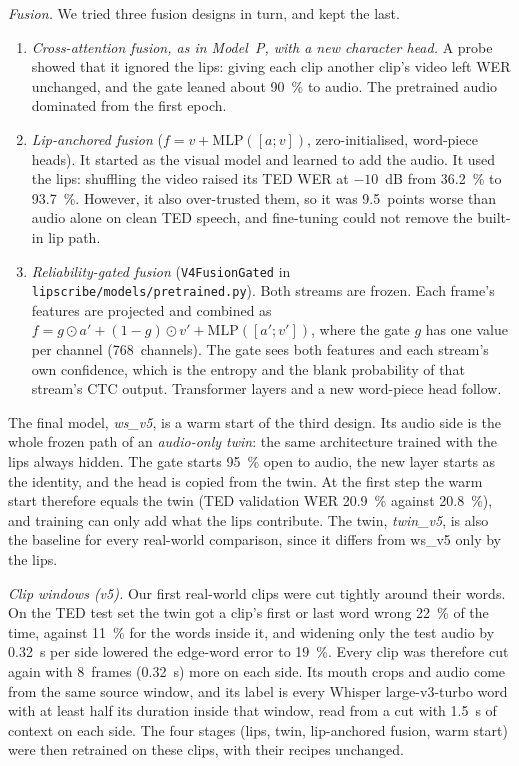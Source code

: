 \textit{Fusion.} We tried three fusion designs in turn, and kept the last.
\begin{enumerate}
\item \textit{Cross-attention fusion, as in Model~P, with a new character head.} A probe showed
that it ignored the lips: giving each clip another clip's video left WER unchanged, and the gate
leaned about 90~\% to audio. The pretrained audio dominated from the first epoch.
\item \textit{Lip-anchored fusion} ($f = v + \mathrm{MLP}([a; v])$, zero-initialised, word-piece
heads). It started as the visual model and learned to add the audio. It used the lips: shuffling
the video raised its TED WER at $-10$~dB from 36.2~\% to 93.7~\%. However, it also over-trusted
them, so it was 9.5~points worse than audio alone on clean TED speech, and fine-tuning could not
remove the built-in lip path.
\item \textit{Reliability-gated fusion} (\texttt{V4FusionGated} in
\texttt{lipscribe/models/pretrained.py}). Both streams are frozen. Each frame's features are
projected and combined as $f = g \odot a' + (1 - g) \odot v' + \mathrm{MLP}([a'; v'])$, where the
gate $g$ has one value per channel (768~channels). The gate sees both features and each stream's
own confidence, which is the entropy and the blank probability of that stream's CTC output.
Transformer layers and a new word-piece head follow.
\end{enumerate}
The final model, \textit{ws\_v5}, is a warm start of the third design. Its audio side is the whole
frozen path of an \textit{audio-only twin}: the same architecture trained with the lips always
hidden. The gate starts 95~\% open to audio, the new layer starts as the identity, and the head is
copied from the twin. At the first step the warm start therefore equals the twin (TED validation
WER 20.9~\% against 20.8~\%), and training can only add what the lips contribute. The twin,
\textit{twin\_v5}, is also the baseline for every real-world comparison, since it differs from
ws\_v5 only by the lips.

\textit{Clip windows (v5).} Our first real-world clips were cut tightly around their words. On the
TED test set the twin got a clip's first or last word wrong 22~\% of the time, against 11~\% for
the words inside it, and widening only the test audio by 0.32~s per side lowered the edge-word
error to 19~\%. Every clip was therefore cut again with 8~frames (0.32~s) more on each side.
Its mouth crops and audio come from the same source window, and its label is every Whisper
large-v3-turbo word with at least half its duration inside that window, read from a cut with
1.5~s of context on each side. The four stages (lips, twin, lip-anchored fusion, warm start) were
then retrained on these clips, with their recipes unchanged.

